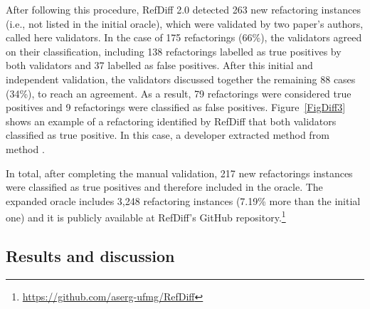 After following this procedure, RefDiff 2.0 detected 263 new refactoring instances (i.e., not listed in the initial oracle), which were validated by two paper's authors, called here validators. In the case of 175 refactorings (66\%), the validators agreed on their classification, including 138 refactorings labelled as true positives by both validators and 37 labelled as false positives. After this initial and independent validation, the validators discussed together the remaining 88 cases (34\%), to reach an agreement. As a result, 79 refactorings were considered true positives and 9 refactorings were classified as false positives.
Figure~\ref{FigDiff3} shows an example of a refactoring identified by RefDiff that both validators classified as true positive.
In this case, a developer extracted method  from method .

In total, after completing the manual validation, 217 new refactorings instances were classified as true positives and therefore included in the oracle.
The expanded oracle includes 3,248 refactoring instances (7.19\% more than the initial one) and it is publicly available at RefDiff's GitHub repository.\footnote{\url{https://github.com/aserg-ufmg/RefDiff}}

\subsection{Results and discussion}
\label{sec:eval:java:results}



